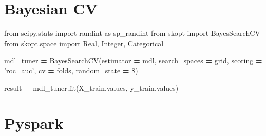 \documentclass[]{book}
\newenvironment{Shaded}{\begin{snugshade}}{\end{snugshade}}
\newcommand{\DecValTok}[1]{\textcolor[rgb]{0.00,0.00,0.81}{#1}}
\newcommand{\ImportTok}[1]{#1}
\newcommand{\NormalTok}[1]{#1}
\newcommand{\OperatorTok}[1]{\textcolor[rgb]{0.81,0.36,0.00}{\textbf{#1}}}
\newcommand{\StringTok}[1]{\textcolor[rgb]{0.31,0.60,0.02}{#1}}
\begin{document}
\hypertarget{bayesian-cv}{%
\section{Bayesian CV}\label{bayesian-cv}}

\begin{Shaded}
\begin{Highlighting}[]
\ImportTok{from}\NormalTok{ scipy.stats }\ImportTok{import}\NormalTok{ randint }\ImportTok{as}\NormalTok{ sp_randint}
\ImportTok{from}\NormalTok{ skopt }\ImportTok{import}\NormalTok{ BayesSearchCV}
\ImportTok{from}\NormalTok{ skopt.space }\ImportTok{import}\NormalTok{ Real, Integer, Categorical}

\NormalTok{mdl_tuner }\OperatorTok{=}\NormalTok{ BayesSearchCV(estimator }\OperatorTok{=}\NormalTok{ mdl, search_spaces }\OperatorTok{=}\NormalTok{ grid, scoring }\OperatorTok{=} \StringTok{'roc_auc'}\NormalTok{,}
\NormalTok{                          cv }\OperatorTok{=}\NormalTok{ folds, random_state }\OperatorTok{=} \DecValTok{8}\NormalTok{)}
                          
\NormalTok{result }\OperatorTok{=}\NormalTok{ mdl_tuner.fit(X_train.values, y_train.values)}
\end{Highlighting}
\end{Shaded}

\hypertarget{pyspark}{%
\section{Pyspark}\label{pyspark}}
\end{document}
